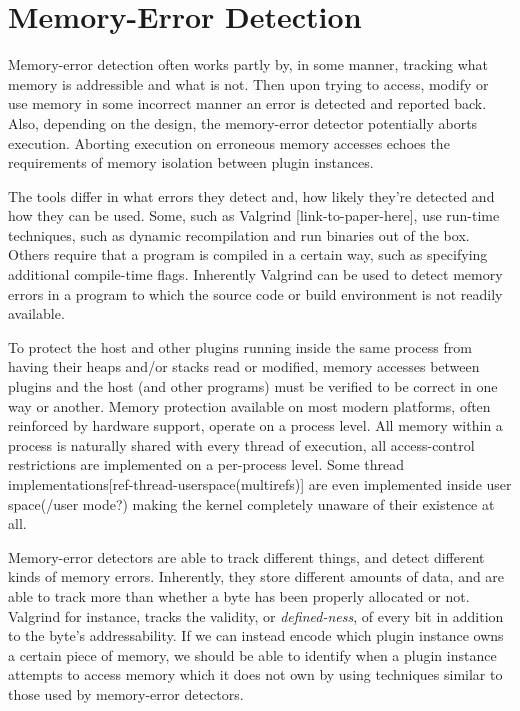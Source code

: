 \chapter {Memory-Error Detection}

Memory-error detection often works partly by, in some manner, tracking what
memory is addressible and what is not.
Then upon trying to access, modify or use memory in some incorrect manner an
error is detected and reported back.
Also, depending on the design, the memory-error detector potentially aborts
execution.
Aborting execution on erroneous memory accesses echoes the requirements of
memory isolation between plugin instances.

The tools differ in what errors they detect and, how likely they're detected and
how they can be used.
Some, such as Valgrind [link-to-paper-here], use run-time techniques, such as
dynamic recompilation and run binaries out of the box.
Others require that a program is compiled in a certain way, such as specifying
additional compile-time flags.
Inherently Valgrind can be used to detect memory errors in a program to which
the source code or build environment is not readily available.

To protect the host and other plugins running inside the same process from
having their heaps and/or stacks read or modified, memory accesses between
plugins and the host (and other programs) must be verified to be correct in one
way or another.
Memory protection available on most modern platforms, often reinforced by
hardware support, operate on a process level.
All memory within a process is naturally shared with every thread of execution,
all access-control restrictions are implemented on a per-process level.
Some thread implementations[ref-thread-userspace(multirefs)] are even
implemented inside user space(/user mode?) making the kernel completely unaware
of their existence at all.

Memory-error detectors are able to track different things, and detect different
kinds of memory errors.
Inherently, they store different amounts of data, and are able to track more
than whether a byte has been properly allocated or not.
Valgrind for instance, tracks the validity, or \emph{defined-ness}, of every bit
in addition to the byte's addressability.
If we can instead encode which plugin instance owns a certain piece of memory,
we should be able to identify when a plugin instance attempts to access memory
which it does not own by using techniques similar to those used by memory-error
detectors.

